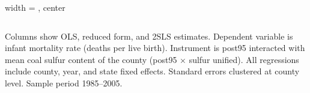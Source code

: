 \begin{table}[htbp]
\begin{adjustbox}{width = \textwidth, center}
\begin{tabular}{lccc}
         \bottomrule
         
      \end{tabular}
      
      
      
   \end{adjustbox}
      {\tiny\linespread{1}\selectfont \par \raggedright 
   Columns show OLS, reduced form, and 2SLS estimates. Dependent variable is infant mortality rate (deaths per live birth). Instrument is post95 interacted with mean coal sulfur content of the county (post95 $\times$ sulfur unified). All regressions include county, year, and state fixed effects. Standard errors clustered at county level. Sample period 1985--2005.}
   
\end{table}


